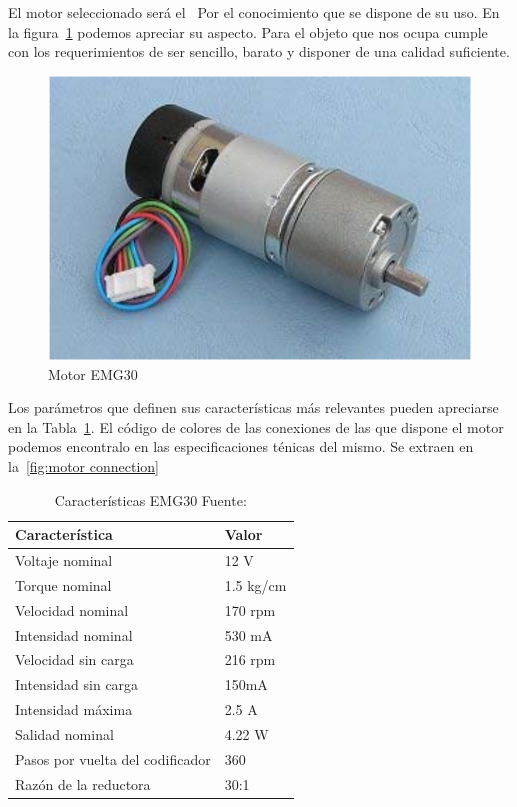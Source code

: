 
El motor seleccionado será el~\cite{EMG30datasheet} Por el conocimiento que se dispone de su uso.
En la figura~\cref{fig:EMG Motor} podemos apreciar su aspecto.
Para el objeto que nos ocupa cumple con los requerimientos de ser sencillo, barato y disponer de una calidad suficiente.

\begin{figure}[H]
    \centering
    \includegraphics[scale = 0.4]{part/Proyecto_ejecutivo/memoria_constructiva/motor/img/MotorEMG30}
    \caption{Motor EMG30\cite{EMG30datasheet}}\label{fig:EMG Motor}
\end{figure}

Los parámetros que definen sus características más relevantes pueden apreciarse en la Tabla~\ref{tab:EMG30specifications}.
El código de colores de las conexiones de las que dispone el motor podemos encontralo en las especificaciones ténicas del mismo.
Se extraen en la~\cref{fig:motor connection}


\begin{table}[H]
    \centering
    \begin{tabular}{|l|l|}
        \hline
        Característica & Valor\\
        \hline
        Voltaje nominal & 12 V\\
        \hline
        Torque nominal & 1.5 kg/cm\\
        \hline
        Velocidad nominal & 170 rpm\\
        \hline
        Intensidad nominal & 530 mA\\
        \hline
        Velocidad sin carga& 216 rpm\\
        \hline
        Intensidad sin carga& 150mA\\
        \hline
        Intensidad máxima& 2.5 A\\
        \hline
        Salidad nominal & 4.22 W\\
        \hline
        Pasos por vuelta del codificador& 360 \\
        \hline
        Razón de la reductora & 30:1\\
        \hline
    \end{tabular}
    \caption{Características EMG30 Fuente:\cite{EMG30datasheet}}\label{tab:EMG30specifications}
\end{table}


